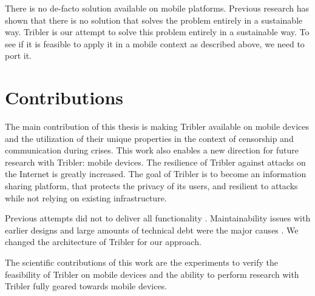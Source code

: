There is no de-facto solution available on mobile platforms.
Previous research has shown that there is no solution that solves the problem entirely in a sustainable way. \cite{survey_brussee}
Tribler is our attempt to solve this problem entirely in a sustainable way.
To see if it is feasible to apply it in a mobile context as described above, we need to port it.


\section{Contributions}
The main contribution of this thesis is making Tribler available on mobile devices and the utilization of their unique properties in the context of censorship and communication during crises.
This work also enables a new direction for future research with Tribler: mobile devices.
The resilience of Tribler against attacks on the Internet is greatly increased.
The goal of Tribler is to become an information sharing platform, that protects the privacy of its users, and resilient to attacks while not relying on existing infrastructure.

Previous attempts did not to deliver all functionality \cite{tribler2014play,tribler2014at3,tribler-anon-hd}.
Maintainability issues with earlier designs and large amounts of technical debt were the major causes \cite{thesis_martijn}.
We changed the architecture of Tribler for our approach.

The scientific contributions of this work are the experiments to verify the feasibility of Tribler on mobile devices and the ability to perform research with Tribler fully geared towards mobile devices.


